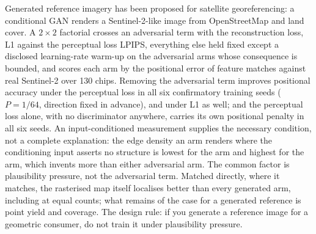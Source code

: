 Generated reference imagery has been proposed for satellite georeferencing: a conditional
GAN renders a Sentinel-2-like image from OpenStreetMap and land cover. A
$2\times2$ factorial crosses an adversarial term with the reconstruction loss, L1 against the perceptual loss LPIPS, everything else held fixed except a disclosed learning-rate warm-up on the adversarial arms whose consequence is bounded, and scores
each arm by the
positional error of feature matches against real Sentinel-2 over 130 chips. Removing the
adversarial term improves positional accuracy under the perceptual loss in all six
confirmatory training seeds ($P = 1/64$, direction fixed in advance), and under L1 as well;
and the perceptual loss alone, with no discriminator anywhere, carries its own positional
penalty in all six seeds. An input-conditioned measurement supplies the necessary condition, not a complete
explanation: the edge density
an arm renders where the conditioning input asserts no structure is lowest for the \Lone{}
arm and highest for the \LPIPSonly{} arm, which invents more than either adversarial arm. The common factor is plausibility pressure, not the adversarial term. Matched directly, where it matches, the rasterised map itself localises better than every
generated arm, including at equal counts; what remains of the case for a generated
reference is point yield and coverage. The design rule: if you generate a reference image for a geometric consumer, do not
train it under plausibility pressure.
